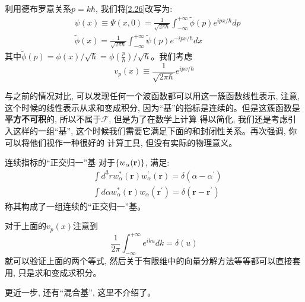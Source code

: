 利用德布罗意关系$p=k\hbar$, 我们将\ref{2.26}改写为:
\begin{align}
    &\psi(x)\equiv\Psi(x,0)=\frac{1}{\sqrt{2\pi\hbar}}\int_{-\infty}^{+\infty}\tilde{\phi}(p)e^{ipx/\hbar}dp\\
    &\tilde{\phi}(x)=\frac{1}{\sqrt{2\pi\hbar}}\int_{-\infty}^{+\infty}\tilde{\psi}(p)e^{-ipx/\hbar}dx
\end{align}
其中$\tilde{\phi}(p)=\phi(x)/\sqrt{\hbar}=\phi(\frac{p}{\hbar})/\sqrt{\hbar}$。我们考虑$$v_p(x)\equiv\frac{1}{\sqrt{2\pi\hbar}}e^{ipx/\hbar}$$

与之前的情况对比, 可以发现任何一个波函数都可以用这一簇函数线性表示, 注意, 这个时候的线性表示从求和变成积分, 因为“基”的指标是连续的。但是这簇函数是\textbf{平方不可积}的, 所以不属于$\mathscr{F}$, 但是为了在数学上计算
得以简化, 我们还是考虑引入这样的一组“基”, 这个时候我们需要它满足下面的和封闭性关系。再次强调, 你可以将他们视作一种很好的
计算工具, 但没有实际的物理意义。
\begin{define}{连续指标的“正交归一”基}
    对于$\{w_\alpha(\bf{r})\}$, 满足:
    \begin{align}
            &\int d^3r w^*_\alpha(\bm{r}) w_\alpha^\prime(\bm{r})=\delta\left(\alpha-\alpha^\prime\right)\\
            &\int d\alpha w^*_\alpha(\bm{r}) w_\alpha(\bm{r^\prime})=\delta\left(\bm{r}-\bm{r^\prime}\right)
    \end{align}
    称其构成了一组连续的“正交归一”基。
\end{define}
对于上面的$v_p(x)$注意到\[\frac{1}{{2\pi }}\int_{ - \infty }^{ + \infty } {{e^{iku}}} dk = \delta (u)\]就可以验证上面的两个等式, 然后关于有限维中的向量分解方法等等都可以直接套用, 只是求和变成求积分。

更近一步, 还有“混合基”, 这里不介绍了。
